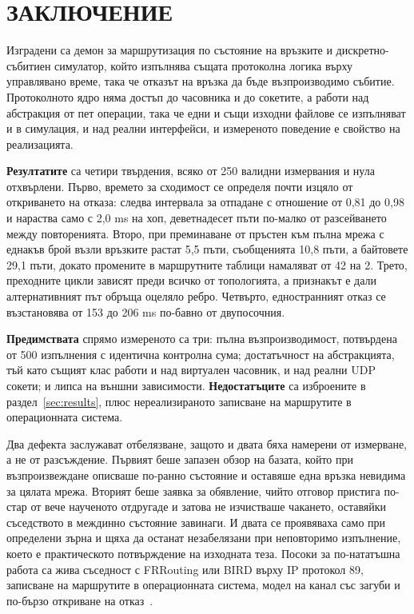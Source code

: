 \section*{ЗАКЛЮЧЕНИЕ}
\label{sec:conclusion}

Изградени са демон за маршрутизация по състояние на връзките и дискретно-събитиен симулатор,
който изпълнява същата протоколна логика върху управлявано време, така че отказът на връзка да
бъде възпроизводимо събитие. Протоколното ядро няма достъп до часовника и до сокетите, а работи
над абстракция от пет операции, така че едни и същи изходни файлове се изпълняват и в симулация,
и над реални интерфейси, и измереното поведение е свойство на реализацията.

\textbf{Резултатите} са четири твърдения, всяко от 250 валидни измервания и нула отхвърлени.
Първо, времето за сходимост се определя почти изцяло от откриването на отказа: следва интервала
за отпадане с отношение от 0,81 до 0,98 и нараства само с 2,0 ms на хоп, деветнадесет пъти
по-малко от разсейването между повторенията. Второ, при преминаване от пръстен към пълна мрежа
с еднакъв брой възли връзките растат 5,5 пъти, съобщенията 10,8 пъти, а байтовете 29,1 пъти,
докато промените в маршрутните таблици намаляват от 42 на 2. Трето, преходните цикли зависят
преди всичко от топологията, а признакът е дали алтернативният път обръща оцеляло ребро.
Четвърто, едностранният отказ се възстановява от 153 до 206 ms по-бавно от двупосочния.

\textbf{Предимствата} спрямо измереното са три: пълна възпроизводимост, потвърдена от 500
изпълнения с идентична контролна сума; достатъчност на абстракцията, тъй като същият клас
 работи и над виртуален часовник, и над реални UDP сокети; и липса на външни
зависимости. \textbf{Недостатъците} са изброените в раздел~\ref{sec:results}, плюс
нереализираното записване на маршрутите в операционната система.

Два дефекта заслужават отбелязване, защото и двата бяха намерени от измерване, а не от
разсъждение. Първият беше запазен обзор на базата, който при възпроизвеждане описваше по-ранно
състояние и оставяше една връзка невидима за цялата мрежа. Вторият беше заявка за обявление,
чийто отговор пристига по-стар от вече наученото отдругаде и затова не изчистваше чакането,
оставяйки съседството в междинно състояние завинаги. И двата се проявяваха само при определени
зърна и щяха да останат незабелязани при неповторимо изпълнение, което е практическото
потвърждение на изходната теза. Посоки за по-нататъшна работа са жива съседност с FRRouting или
BIRD върху IP протокол 89, записване на маршрутите в операционната система, модел на канал със
загуби и по-бързо откриване на отказ~\cite{rfc5880}.
